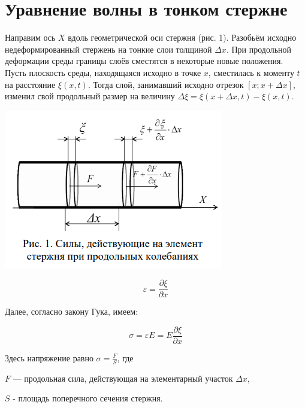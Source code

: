 \documentclass[a4paper, 12pt]{article}
\begin{document}
    \section{Уравнение волны в тонком стержне}
    \begin{minipage}{0.6\textwidth}
        Направим ось $X$ вдоль геометрической оси стержня (рис. 1). Разобьём
        исходно недеформированный стержень на тонкие слои толщиной $\Delta x$. При
        продольной деформации среды границы слоёв сместятся в некоторые новые положения. Пусть плоскость среды, находящаяся исходно в точке $x$,
        сместилась к моменту $t$ на расстояние $\xi(x,t)$. Тогда слой, занимавший исходно отрезок $[x; x + \Delta x]$, изменил свой продольный размер на величину $\Delta \xi = \xi(x + \Delta x, t) - \xi(x, t)$.
    \end{minipage}
    \hfill
    \begin{minipage}{0.35\textwidth}
        \includegraphics[scale=0.7]{picture1.png}
    \end{minipage}
        
        \begin{equation}
            \varepsilon = \frac{\partial\xi}{\partial x}
        \end{equation}

        Далее, согласно закону Гука, имеем:
        
        \begin{equation}
            \sigma = \varepsilon E = E \frac{\partial\xi}{\partial x}
        \end{equation}
        
        Здесь напряжение равно $\sigma = \frac{F}{S}$, где 
        
        $F$ — продольная сила, действующая на элементарный участок $\Delta x$, 
        
        $S$ - площадь поперечного сечения стержня. 
\end{document}
